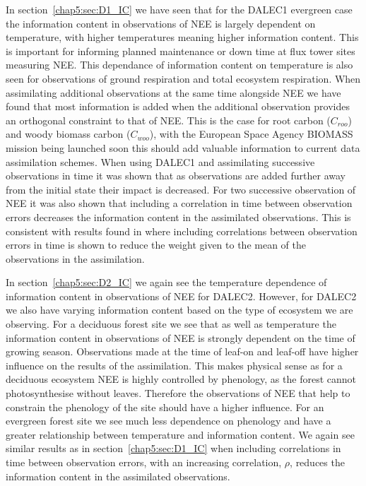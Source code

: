 In section~\ref{chap5:sec:D1_IC} we have seen that for the DALEC1 evergreen case the information content in observations of NEE is largely dependent on temperature, with higher temperatures meaning higher information content. This is important for informing planned maintenance or down time at flux tower sites measuring NEE. This dependance of information content on temperature is also seen for observations of ground respiration and total ecosystem respiration. When assimilating additional observations at the same time alongside NEE we have found that most information is added when the additional observation provides an orthogonal constraint to that of NEE. This is the case for root carbon (\(C_{roo}\)) and woody biomass carbon (\(C_{woo}\)), with the European Space Agency BIOMASS mission being launched soon this should add valuable information to current data assimilation schemes. When using DALEC1 and assimilating successive observations in time it was shown that as observations are added further away from the initial state their impact is decreased. For two successive observation of NEE it was also shown that including a correlation in time between observation errors decreases the information content in the assimilated observations. This is consistent with results found in \citet{jarvinen1999variational} where including correlations between observation errors in time is shown to reduce the weight given to the mean of the observations in the assimilation.

In section~\ref{chap5:sec:D2_IC} we again see the temperature dependence of information content in observations of NEE for DALEC2. However, for DALEC2 we also have varying information content based on the type of ecosystem we are observing. For a deciduous forest site we see that as well as temperature the information content in observations of NEE is strongly dependent on the time of growing season. Observations made at the time of leaf-on and leaf-off have higher influence on the results of the assimilation. This makes physical sense as for a deciduous ecosystem NEE is highly controlled by phenology, as the forest cannot photosynthesise without leaves. Therefore the observations of NEE that help to constrain the phenology of the site should have a higher influence. For an evergreen forest site we see much less dependence on phenology and have a greater relationship between temperature and information content. We again see similar results as in section~\ref{chap5:sec:D1_IC} when including correlations in time between observation errors, with an increasing correlation, \(\rho\), reduces the information content in the assimilated observations.
